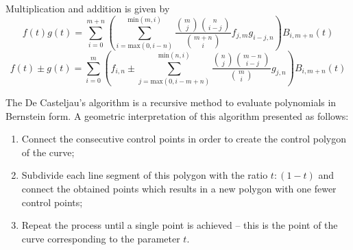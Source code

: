 \par Multiplication and addition is given by
\begin{equation}
    \label{eq:bern_mul}
    f(t)g(t) = \sum^{m+n}_{i=0}  \left(\sum_{i=\text{max}(0,i-n)}^{\text{min}(m,i)} \frac{\binom{m}{j}\binom{n}{i-j}}{\binom{m+n}{i}} f_{j,m}g_{i-j,n}\right) B_{i,m+n}(t)
\end{equation}
\begin{equation}
    \label{eq:bern_sum}
    f(t)\pm g(t) = 
    \sum^{m}_{i=0}  \left(f_{i,n} \pm \sum_{j=\text{max}(0,i-m+n)}^{\text{min}(n,i)} \frac{\binom{n}{j}\binom{m-n}{i-j}}{\binom{m}{i}} g_{j,n}\right) B_{i,m+n}(t)
\end{equation}

\par The De Casteljau's algorithm \cite{shene2012finding} is a recursive method to evaluate polynomials in Bernstein form. A geometric interpretation of this algorithm presented as follows:
\begin{enumerate}
    \item Connect the consecutive control points in order to create the control polygon of the curve;
	\item Subdivide each line segment of this polygon with the ratio $t:(1-t)$ and connect the obtained points which results in a new polygon with one fewer control points;
    \item Repeat the process until a single point is achieved – this is the point of the curve corresponding to the parameter $t$.
\end{enumerate}

